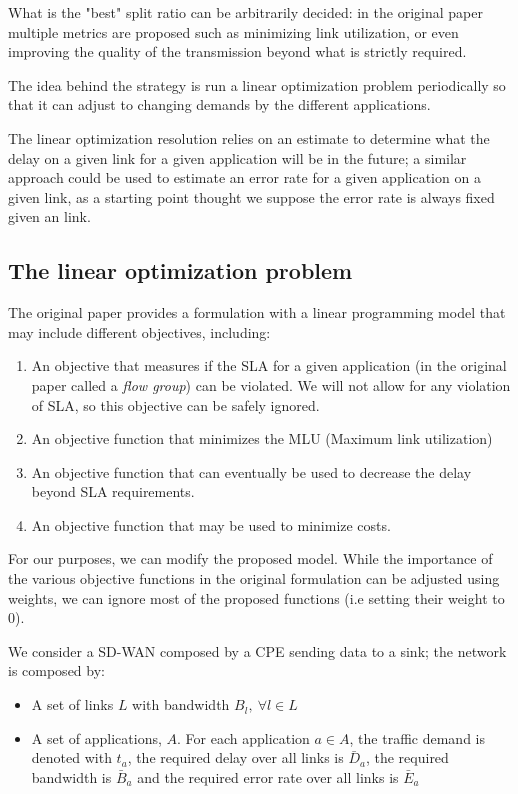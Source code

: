 	What is the "best" split ratio can be arbitrarily decided: in the original paper multiple metrics are proposed such as minimizing link utilization, or even improving the quality of the transmission beyond what is strictly required.
	
	The idea behind the strategy is run a linear optimization problem periodically so that it can adjust to changing demands by the different applications.
	
	The linear optimization resolution relies on an estimate to determine what the delay on a given link for a given application will be in the future; a similar approach could be used to estimate an error rate for a given application on a given link, as a starting point thought we suppose the error rate is always fixed given an link.
	
	
	\subsection{The linear optimization problem}
	
	The original paper provides a formulation with a linear programming model that may include different objectives, including:
	
	\begin{enumerate}
		\item An objective that measures if the SLA for a given application (in the original paper called a \textit{flow group}) can be violated. We will not allow for any violation of SLA, so this objective can be safely ignored.
		\item An objective function that minimizes the MLU (Maximum link utilization)
		\item An objective function that can eventually be used to decrease the delay beyond SLA requirements.
		\item An objective function that may be used to minimize costs.
	\end{enumerate}
	
	For our purposes, we can  modify the proposed model. While the importance of the various objective functions in the original formulation can be adjusted using weights, we can ignore most of the proposed functions (i.e setting their weight to 0).
	
	We consider a SD-WAN composed by a CPE sending data to a sink; the network is composed by:
	\begin{itemize}
		\item A set of links $L$ with bandwidth $B_l, \ \forall l \in L$
		\item A set of applications, $A$. For each application $a \in A$, the traffic demand is denoted with $t_a$, the required delay over all links is $\bar{D}_a$, the required bandwidth is $\bar{B}_a$ and the required error rate over all links is $\bar{E}_a$
	\end{itemize}
	
